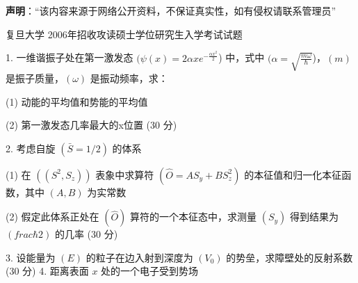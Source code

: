 

\begin{issues}
\issueTODO
\end{issues}

\textbf{声明}：“该内容来源于网络公开资料，不保证真实性，如有侵权请联系管理员”

复旦大学 2006年招收攻读硕士学位研究生入学考试试题

1. 一维谐振子处在第一激发态 $( \psi (x) = 2 \alpha x e^{-\frac{\alpha x^2}{2}} $) 中，式中 $( \alpha = \sqrt{\frac{m \omega}{\hbar}}$)，$( m )$ 是振子质量，$(\omega)$ 是振动频率，求：

(1) 动能的平均值和势能的平均值

(2) 第一激发态几率最大的x位置 (30 分)

2. 考虑自旋 $(\bar{S} = 1/2)$ 的体系

(1) 在 $((S^2, S_z))$ 表象中求算符 $(\hat{O} = A S_y + B S_z^2 )$ 的本征值和归一化本征函数，其中 $( A, B )$ 为实常数

(2) 假定此体系正处在 $(\hat{O})$ 算符的一个本征态中，求测量 $( S_y )$ 得到结果为 $(frac{\hbar}{2})$ 的几率 (30 分)

3. 设能量为 $( E )$ 的粒子在边入射到深度为 $( V_0 )$ 的势垒，求障壁处的反射系数 (30 分)
4. 距离表面 $x$ 处的一个电子受到势场
\\[ U(x) = \\begin{cases} -\\frac{k}{x} & x > 0 \\\\ \\infty & x \\leq 0 \\end{cases} \\quad (k \\text{为常数})\\]
